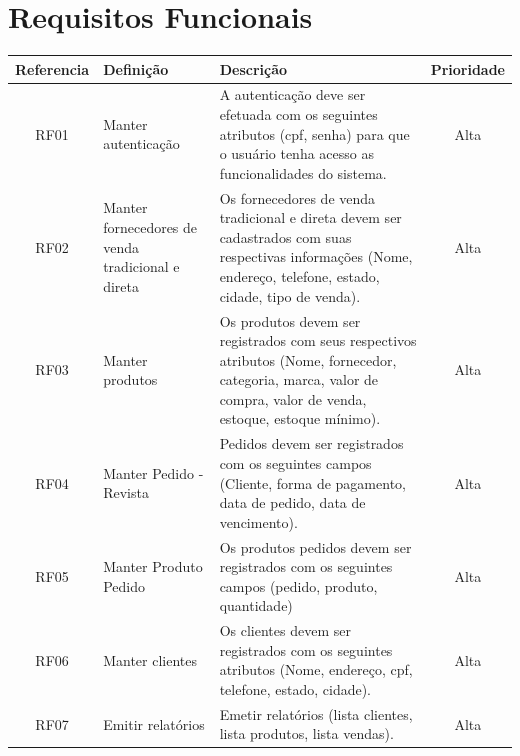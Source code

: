 \documentclass[chapter=TITLE,12pt,oneside,a4paper,english,french,sumario=tradicional,spanish,brazil,]{abntex2}
\begin{document}
\section{Requisitos Funcionais}
\renewcommand\tabularxcolumn[1]{m{#1}}
\begin{table}[!htpb]
    \begin{center}
        \begin{tabularx}{\textwidth}{|c|p{3cm}|X|c|}
        \rowcolor[gray]{0.9}
        \hline
        Referencia &
        Definição &
        Descrição &
        Prioridade \\

        \hline
        RF01 &
        Manter autenticação &
        A autenticação deve ser efetuada com os seguintes atributos (cpf, senha) para que o usuário tenha acesso as funcionalidades do sistema. &
        Alta \\

        \hline
        RF02 &
        Manter fornecedores de venda tradicional e direta &
        Os fornecedores de venda tradicional e direta devem ser cadastrados com suas respectivas informações (Nome, endereço, telefone, estado, cidade, tipo de venda).&
        Alta \\

        \hline
        RF03 &
        Manter produtos &
        Os produtos devem ser registrados com seus respectivos atributos (Nome, fornecedor, categoria, marca, valor de compra, valor de venda, estoque, estoque mínimo).&
        Alta \\

        \hline
        RF04 &
        Manter Pedido - Revista &
        Pedidos devem ser registrados com os seguintes campos (Cliente, forma de pagamento, data de pedido, data de vencimento).&
        Alta \\

        \hline
        RF05 &
        Manter Produto Pedido &
        Os produtos pedidos devem ser registrados com os seguintes campos (pedido, produto, quantidade)&
        Alta \\

        \hline
        RF06 &
        Manter clientes &
        Os clientes devem ser registrados com os seguintes atributos (Nome, endereço, cpf,  telefone, estado, cidade).&
        Alta \\

        \hline
        RF07 &
         Emitir relatórios &
        Emetir relatórios (lista clientes, lista produtos, lista vendas).&
        Alta \\


\end{tabularx}
\end{center}
\end{table}
\end{document}
